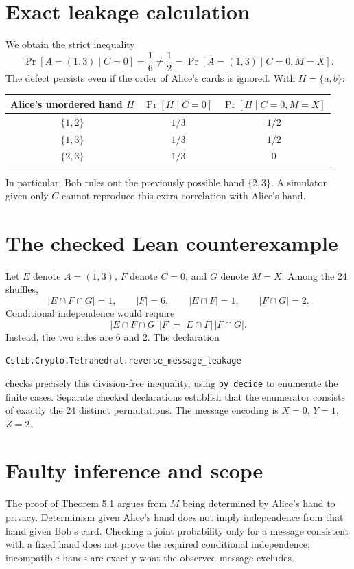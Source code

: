 \documentclass[10pt,a4paper]{article}
\newcommand{\Prb}{\mathop{\mathrm{Pr}}}
\begin{document}
\section{Exact leakage calculation}
We obtain the strict inequality
$$
 \Prb[A=(1,3)\mid C=0]=\frac16
 \ne \frac12=\Prb[A=(1,3)\mid C=0,M=X].
$$
The defect persists even if the order of Alice's cards is ignored. With $H=\{a,b\}$:
\begin{center}
\begin{tabular}{ccc}
\toprule Alice's unordered hand $H$ & $\Prb[H\mid C=0]$ & $\Prb[H\mid C=0,M=X]$\\\midrule
$\{1,2\}$ & $1/3$ & $1/2$\\
$\{1,3\}$ & $1/3$ & $1/2$\\
$\{2,3\}$ & $1/3$ & $0$\\\bottomrule
\end{tabular}
\end{center}
In particular, Bob rules out the previously possible hand $\{2,3\}$. A simulator given only $C$ cannot reproduce this extra correlation with Alice's hand.
\section{The checked Lean counterexample}
Let $E$ denote $A=(1,3)$, $F$ denote $C=0$, and $G$ denote $M=X$. Among the 24 shuffles,
$$
 |E\cap F\cap G|=1,\qquad |F|=6,\qquad
 |E\cap F|=1,\qquad |F\cap G|=2.
$$
Conditional independence would require
$$
 |E\cap F\cap G|\,|F|=|E\cap F|\,|F\cap G|.
$$
Instead, the two sides are $6$ and $2$. The declaration
\begin{center}
\texttt{Cslib.Crypto.Tetrahedral.reverse\_message\_leakage}
\end{center}
checks precisely this division-free inequality, using \texttt{by decide} to enumerate the finite cases. Separate checked declarations establish that the enumerator consists of exactly the 24 distinct permutations. The message encoding is $X=0$, $Y=1$, $Z=2$.
\section{Faulty inference and scope}
The proof of Theorem 5.1 argues from $M$ being determined by Alice's hand to privacy. Determinism given Alice's hand does not imply independence from that hand given Bob's card. Checking a joint probability only for a message consistent with a fixed hand does not prove the required conditional independence; incompatible hands are exactly what the observed message excludes.
\end{document}
